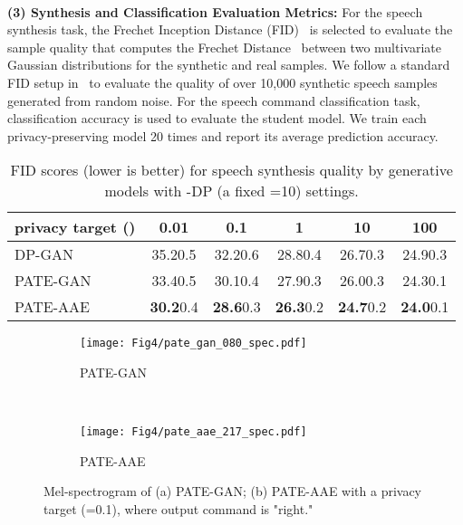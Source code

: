 \documentclass[a4paper]{article}
\begin{document}
\\
\textbf{(3) Synthesis and Classification Evaluation Metrics:}
For the speech synthesis task, the Frechet Inception Distance (FID)~\cite{shmelkov2018good} is selected to evaluate the sample quality that computes the Frechet Distance~\cite{dowson1982frechet} between two multivariate Gaussian distributions for the synthetic and real samples. We follow a standard FID setup in~\cite{haque2020high} to evaluate the quality of over 10,000 synthetic speech samples generated from random noise. For the speech command classification task, classification accuracy is used to evaluate the student model. We train each privacy-preserving model 20 times and report its average prediction accuracy.




\begin{table}[ht!]
\centering
\caption{FID scores (lower is better) for speech synthesis quality by generative models with -DP (a fixed =10) settings.}
\label{tab:1:fid}
\begin{adjustbox}{width=0.47\textwidth}
\begin{tabular}{|l|ccccc|}
\hline
privacy target () & 0.01 & 0.1  & 1    & 10 & 100   \\ \hline \hline
DP-GAN~\cite{xie2018differentially}         & 35.20.5 & 32.20.6 & 28.80.4 & 26.70.3 & 24.90.3 \\ \hline
PATE-GAN~\cite{jordon2019pate}       & 33.40.5 & 30.10.4 & 27.90.3 & 26.00.3  & 24.30.1 \\ \hline
PATE-AAE       & \textbf{30.2}0.4 & \textbf{28.6}0.3 & \textbf{26.3}0.2 & \textbf{24.7}0.2& \textbf{24.0}0.1 \\ \hline
\end{tabular}
\end{adjustbox}
\end{table}


\begin{figure}[ht!]
        \centering
        \begin{subfigure}[b]{0.213\textwidth}
            \centering
            \texttt{[image: Fig4/pate\_gan\_080\_spec.pdf]}
            \caption[]{{\small PATE-GAN}}
            \label{fig:pateg:s}
        \end{subfigure}
        \quad~~~~
        \begin{subfigure}[b]{0.213\textwidth}
            \centering
            \texttt{[image: Fig4/pate\_aae\_217\_spec.pdf]}
            \caption[]{{\small PATE-AAE}}
            \label{fig:mean and std of net44}
        \end{subfigure}
        \caption[  ]
        {\small Mel-spectrogram of (a) PATE-GAN; (b) PATE-AAE with a privacy target (=0.1), where output command is "right."}
        \label{fig:3}
    \end{figure}
\end{document}
